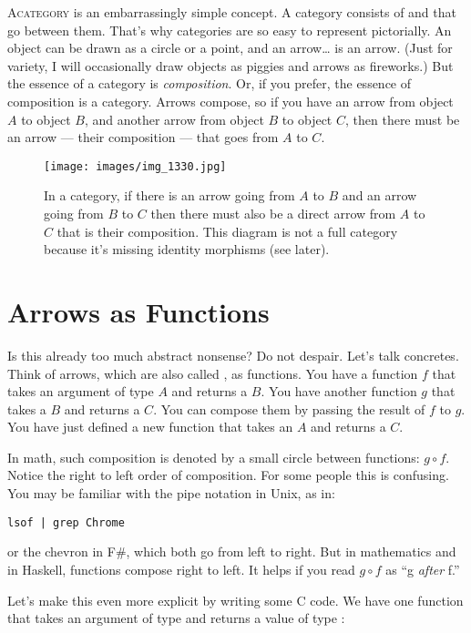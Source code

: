\lettrine[lhang=0.17]{A}{category} is an embarrassingly simple concept.
A category consists of  and  that go between them. That's
why categories are so easy to represent pictorially. An object can be
drawn as a circle or a point, and an arrow\ldots{} is an arrow. (Just
for variety, I will occasionally draw objects as piggies and arrows as
fireworks.) But the essence of a category is \emph{composition}. Or, if you
prefer, the essence of composition is a category. Arrows compose, so
if you have an arrow from object $A$ to object $B$, and another arrow from
object $B$ to object $C$, then there must be an arrow --- their composition
--- that goes from $A$ to $C$.

\begin{figure}
\centering
\texttt{[image: images/img\_1330.jpg]}
\caption{In a category, if there is an arrow going from $A$ to $B$ and an arrow going from $B$ to $C$
then there must also be a direct arrow from $A$ to $C$ that is their composition. This diagram is not a full
category because it’s missing identity morphisms (see later).}
\end{figure}

\section{Arrows as Functions}

Is this already too much abstract nonsense? Do not despair. Let's talk
concretes. Think of arrows, which are also called , as
functions. You have a function $f$ that takes an argument of type $A$ and
returns a $B$. You have another function $g$ that takes a $B$ and returns a $C$.
You can compose them by passing the result of $f$ to $g$. You have just
defined a new function that takes an $A$ and returns a $C$.

In math, such composition is denoted by a small circle between
functions: $g \circ f$. Notice the right to left order of composition. For some
people this is confusing. You may be familiar with the pipe notation in
Unix, as in:

\begin{Verbatim}
lsof | grep Chrome
\end{Verbatim}
or the chevron \code{>>} in F\#, which both
go from left to right. But in mathematics and in Haskell, functions
compose right to left. It helps if you read $g \circ f$ as ``g \emph{after} f.''

Let's make this even more explicit by writing some C code. We have one
function  that takes an argument of type  and
returns a value of type :


